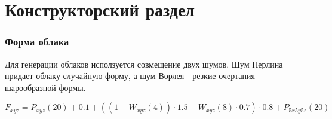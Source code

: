 \chapter{Конструкторский раздел}
\label{cha:design}

\subsection{Форма облака}

Для генерации облаков исползуется совмещение двух шумов. Шум Перлина придает
облаку случайную форму, а шум Ворлея - резкие очертания шарообразной формы.

\begin{equation}\label{eq:noise}
    F_{xyz} = P_{xyz}(20) + 0.1 + ((1 - W_{xyz}(4)) \cdot 1.5 - W_{xyz}(8) \cdot 0.7) \cdot 0.8 + P_{5x5y5z}(20)
\end{equation}
